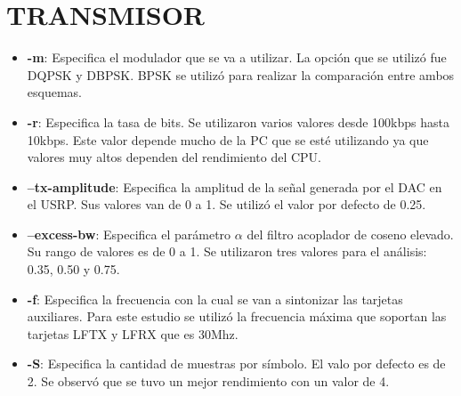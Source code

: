 \section*{TRANSMISOR}
\begin{itemize}
  \item \textbf{-m}: Especifica el modulador que se va a utilizar. La opci\'on que se utiliz\'o fue
  DQPSK y DBPSK. BPSK se utiliz\'o para realizar la comparaci\'on entre ambos esquemas.
  \item \textbf{-r}: Especifica la tasa de bits. Se utilizaron varios valores desde 100kbps hasta
  10kbps. Este valor depende mucho de la PC que se est\'e utilizando ya que valores muy altos
  dependen del rendimiento del CPU.
  \item \textbf{--tx-amplitude}: Especifica la amplitud de la se\~nal generada por el DAC en el
  USRP. Sus valores van de 0 a 1. Se utiliz\'o el valor por defecto de 0.25.
  \item \textbf{--excess-bw}: Especifica el par\'ametro $\alpha$ del filtro acoplador de coseno
  elevado. Su rango de valores es de 0 a 1. Se utilizaron tres valores para el an\'alisis: 0.35,
  0.50 y 0.75.
  \item \textbf{-f}: Especifica la frecuencia con la cual se van a sintonizar las tarjetas
  auxiliares. Para este estudio se utiliz\'o la frecuencia m\'axima que soportan las
  tarjetas LFTX y LFRX que es 30Mhz.
  \item \textbf{-S}: Especifica la cantidad de muestras por s\'imbolo. El valo por defecto es de 2. Se
  observ\'o que se tuvo un mejor rendimiento con un valor de 4.
\end{itemize}

